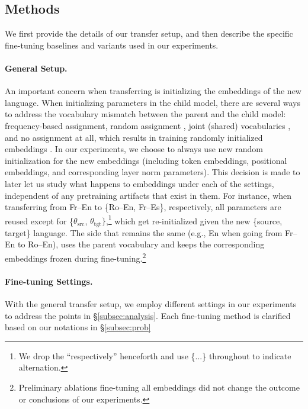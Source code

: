 \subsection{Methods}
\label{subsec:method}

We first provide the details of our transfer setup, and then describe the specific fine-tuning baselines and variants used in our experiments.

\paragraph{General Setup.} An important concern when transferring is initializing the embeddings of the new language. When initializing parameters in the child model, there are several ways to address the vocabulary mismatch between the parent and the child model: frequency-based assignment, random assignment \cite{zoph-etal-2016-transfer}, joint (shared) vocabularies \cite{nguyen-chiang-2017-transfer,kocmi-bojar-2018-trivial,neubig-hu-2018-rapid,DBLP:journals/corr/abs-1909-06516,liu-etal-2020-multilingual}, and no assignment at all, which results in training randomly initialized embeddings \cite{aji-etal-2020-neural}. In our experiments, we choose to always use new random initialization for the new embeddings (including token embeddings, positional embeddings, and corresponding layer norm parameters). This decision is made to later let us study what happens to embeddings under each of the settings, independent of any pretraining artifacts that exist in them. For instance, when transferring from Fr--En to \{Ro--En, Fr--Es\}, respectively, all parameters are reused except for \{$\theta_{\text{src}}$, $\theta_{\text{tgt}}\}$,\footnote{We drop the ``respectively'' henceforth and use \{...\} throughout to indicate alternation.} which get re-initialized given the new \{source, target\} language. The side that remains the same (e.g., En when going from Fr--En to Ro--En), uses the parent vocabulary and keeps the corresponding embeddings frozen during fine-tuning.\footnote{Preliminary ablations fine-tuning all embeddings did not change the outcome or conclusions of our experiments.}

\paragraph{Fine-tuning Settings.} With the general transfer setup, we employ different settings in our experiments to address the points in \S\ref{subsec:analysis}. Each fine-tuning method is clarified based on our notations in \S\ref{subsec:prob}

